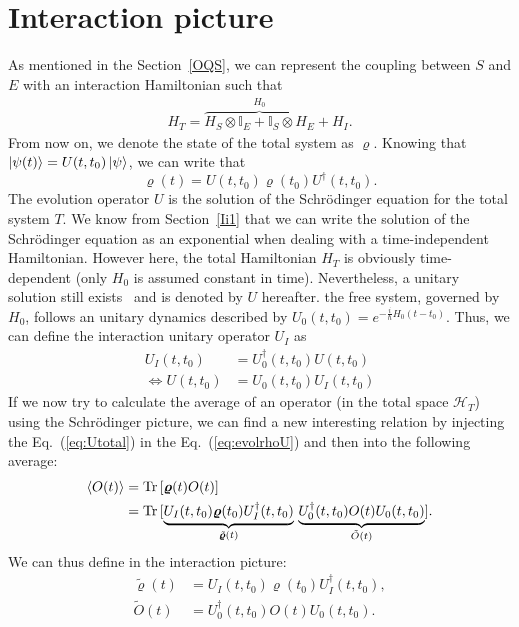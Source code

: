 \section{Interaction picture}
As mentioned in the Section~\ref{OQS}, we can represent the coupling between $S$ and $E$ with an interaction Hamiltonian such that
\begin{align}
    H_T = \overbrace{H_S\otimes\mathbb{I}_E+\mathbb{I}_S\otimes H_E}^{H_0}+H_I.
\end{align}
From now on, we denote the state of the total system as $\bm{\varrho}$. Knowing that $\ket{\psi(t)}=U(t,t_0)\ket{\psi}$, we can write that
\begin{equation}\label{eq:evolrhoU}
    \bm{\varrho}(t) = U(t,t_0)\bm{\varrho}(t_0)U^\dagger(t,t_0).
\end{equation}
The evolution operator $U$ is the solution of the Schrödinger equation for the total system $T$. We know from Section~\ref{Ii1} that we can write the solution of the Schrödinger equation as an exponential when dealing with a time-independent Hamiltonian. However here, the total Hamiltonian $H_T$ is obviously time-dependent (only $H_0$ is assumed constant in time). Nevertheless, a unitary solution still exists~\cite{Breuer} and is denoted by $U$ hereafter. the free system, governed by $H_0$, follows an unitary dynamics described by $U_0(t,t_0)=e^{-\frac{i}{\hbar}H_0 (t-t_0)}$. Thus, we can define the interaction unitary operator $U_I$ as
\begin{align}
    U_I(t,t_0) &= U_0^\dagger(t,t_0)U(t,t_0)\\
    \Leftrightarrow U(t,t_0) &= U_0(t,t_0)U_I(t,t_0)\label{eq:Utotal}
\end{align}
If we now try to calculate the average of an operator (in the total space $\mathcal{H}_T$) using the Schrödinger picture, we can find a new interesting relation by injecting the Eq.~(\ref{eq:Utotal}) in the Eq.~(\ref{eq:evolrhoU}) and then into the following average:
\begin{align*}
    \expval{O(t)} &= \operatorname{Tr}\left[\bm{\varrho}(t)O(t)\right]\\
    &= \mathrm{Tr}\,[\underbrace{U_I(t,t_0)\bm{\varrho}(t_0)U_I^\dagger(t,t_0)}_{\tilde{\bm{\varrho}}(t)}\,\underbrace{U_0^\dagger(t,t_0)O(t)U_0(t,t_0)}_{\tilde{O}(t)}].
\end{align*}
We can thus define in the interaction picture:
\begin{align}
    \tilde{\bm{\varrho}}(t)&=U_I(t,t_0)\bm{\varrho}(t_0)U_I^\dagger(t,t_0),\label{eq:rhoIS}\\
    \tilde{O}(t) &= U_0^\dagger(t,t_0)O(t)U_0(t,t_0)\label{eq:obsIS}.
\end{align}
